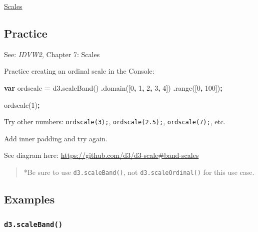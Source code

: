 \documentclass[
  openany]{book}
\newenvironment{Shaded}{\begin{snugshade}}{\end{snugshade}}
\newcommand{\DecValTok}[1]{\textcolor[rgb]{0.00,0.00,0.81}{#1}}
\newcommand{\FunctionTok}[1]{\textcolor[rgb]{0.00,0.00,0.00}{#1}}
\newcommand{\KeywordTok}[1]{\textcolor[rgb]{0.13,0.29,0.53}{\textbf{#1}}}
\newcommand{\NormalTok}[1]{#1}
\newcommand{\OperatorTok}[1]{\textcolor[rgb]{0.81,0.36,0.00}{\textbf{#1}}}
\begin{document}
\href{pdfs/scales.pdf}{Scales}

\hypertarget{practice}{%
\subsection{Practice}\label{practice}}

See: \emph{IDVW2}, Chapter 7: Scales

Practice creating an ordinal scale in the Console:

\begin{Shaded}
\begin{Highlighting}[]
\KeywordTok{var}\NormalTok{ ordscale }\OperatorTok{=}\NormalTok{ d3}\OperatorTok{.}\FunctionTok{scaleBand}\NormalTok{()}
  \OperatorTok{.}\FunctionTok{domain}\NormalTok{([}\DecValTok{0}\OperatorTok{,} \DecValTok{1}\OperatorTok{,} \DecValTok{2}\OperatorTok{,} \DecValTok{3}\OperatorTok{,} \DecValTok{4}\NormalTok{])}
  \OperatorTok{.}\FunctionTok{range}\NormalTok{([}\DecValTok{0}\OperatorTok{,} \DecValTok{100}\NormalTok{])}\OperatorTok{;}
\end{Highlighting}
\end{Shaded}

\begin{Shaded}
\begin{Highlighting}[]
\NormalTok{ordscale(}\DecValTok{1}\NormalTok{)}\OperatorTok{;}
\end{Highlighting}
\end{Shaded}

Try other numbers: \texttt{ordscale(3);}, \texttt{ordscale(2.5);}, \texttt{ordscale(7);}, etc.

Add inner padding and try again.

See diagram here: \url{https://github.com/d3/d3-scale\#band-scales}

\begin{quote}
*Be sure to use \texttt{d3.scaleBand()}, not \texttt{d3.scaleOrdinal()} for this use case.
\end{quote}

\hypertarget{examples}{%
\subsection{Examples}\label{examples}}

\hypertarget{d3.scaleband}{%
\subsubsection*{\texorpdfstring{\texttt{d3.scaleBand()}}{d3.scaleBand()}}\label{d3.scaleband}}
\end{document}
